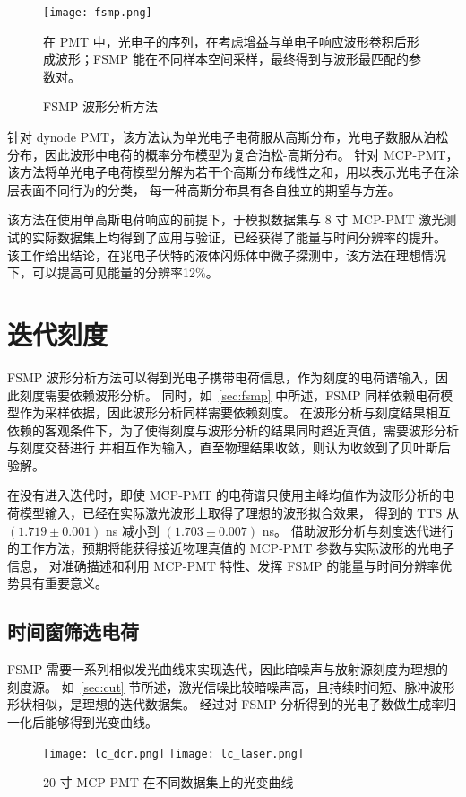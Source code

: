 \begin{figure}
    \centering
    \texttt{[image: fsmp.png]}
    \caption*{在 PMT 中，光电子的序列，在考虑增益与单电子响应波形卷积后形成波形；FSMP 能在不同样本空间采样，最终得到与波形最匹配的参数对。}
    \caption{FSMP 波形分析方法}
\end{figure}

针对 dynode PMT，该方法认为单光电子电荷服从高斯分布，光电子数服从泊松分布，因此波形中电荷的概率分布模型为复合泊松-高斯分布。
针对 MCP-PMT，该方法将单光电子电荷模型分解为若干个高斯分布线性之和，用以表示光电子在涂层表面不同行为的分类，
每一种高斯分布具有各自独立的期望与方差。

该方法在使用单高斯电荷响应的前提下，于模拟数据集与 8 寸 MCP-PMT 激光测试的实际数据集上均得到了应用与验证，已经获得了能量与时间分辨率的提升。
该工作给出结论，在兆电子伏特的液体闪烁体中微子探测中，该方法在理想情况下，可以提高可见能量的分辨率12\%。

\section{迭代刻度}
FSMP 波形分析方法可以得到光电子携带电荷信息，作为刻度的电荷谱输入，因此刻度需要依赖波形分析。
同时，如~\ref{sec:fsmp} 中所述，FSMP 同样依赖电荷模型作为采样依据，因此波形分析同样需要依赖刻度。
在波形分析与刻度结果相互依赖的客观条件下，为了使得刻度与波形分析的结果同时趋近真值，需要波形分析与刻度交替进行
并相互作为输入，直至物理结果收敛，则认为收敛到了贝叶斯后验解。

在没有进入迭代时，即使 MCP-PMT 的电荷谱只使用主峰均值作为波形分析的电荷模型输入，已经在实际激光波形上取得了理想的波形拟合效果，
得到的 TTS 从 $(1.719\pm0.001)$ ns 减小到 $(1.703\pm0.007)$ ns\cite{wangFastStochasticMatching2024a}。
借助波形分析与刻度迭代进行的工作方法，预期将能获得接近物理真值的 MCP-PMT 参数与实际波形的光电子信息，
对准确描述和利用 MCP-PMT 特性、发挥 FSMP 的能量与时间分辨率优势具有重要意义。

\subsection{时间窗筛选电荷}
FSMP 需要一系列相似发光曲线来实现迭代，因此暗噪声与放射源刻度为理想的刻度源。
如~\ref{sec:cut} 节所述，激光信噪比较暗噪声高，且持续时间短、脉冲波形形状相似，是理想的迭代数据集。
经过对 FSMP 分析得到的光电子数做生成率归一化后能够得到光变曲线。

\begin{figure}
    \centering
      {\texttt{[image: lc\_dcr.png]}}
      {\texttt{[image: lc\_laser.png]}}
    \caption{20 寸 MCP-PMT 在不同数据集上的光变曲线}
\end{figure}


